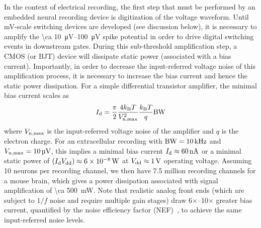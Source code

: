 In the context of electrical recording, the first step that must be performed by an embedded neural recording device is digitization of the voltage waveform.
Until \si{\milli\volt}-scale switching devices are developed (see discussion below), it is necessary to amplify the \SIrange{\ca 10}{100}{\micro\volt} spike potential in order to drive digital switching events in downstream gates.
During this sub-threshold amplification step, a CMOS (or BJT) device will dissipate static power (associated with a bias current). 
Importantly, in order to decrease the input-referred voltage noise of this amplification process, it is necessary to increase the bias current and hence the static power dissipation.
For a simple differential transistor amplifier, the minimal bias current scales as
\[I_{\text{\scriptsize d}} = \frac{\pi}{2} \frac{4k_{\text{\scriptsize B}} T}{V_{\text{\scriptsize n,max}}^2} \frac{k_{\text{\scriptsize B}} T}{q} \text{BW}\]
where $V_{\text{\scriptsize n,max}}$ is the input-referred voltage noise of the amplifier and $q$ is the electron charge.
For an extracellular recording with $\text{BW} = \SI{10}{\kilo\hertz}$ and $V_{\text{\scriptsize n,max}} = \SI{10}{\micro\volt}$, this implies a minimal bias current $I_{\text{\scriptsize d}}\approx\SI{60}{\nano\ampere}$ or a minimal static power of $\left(I_{\text{\scriptsize d}} V_{\text{\scriptsize dd}}\right)\approx\SI{6e-8}{\watt}$ at $V_{\text{\scriptsize dd}}\approx\SI{1}{\volt}$ operating voltage.
Assuming 10 neurons per recording channel, we then have 7.5 million recording channels for a mouse brain, which gives a power dissipation associated with signal amplification of \SI{\ca 500}{\milli\watt}.
Note that realistic analog front ends (which are subject to $1/f$ noise and require multiple gain stages) draw 6$\times$--10$\times$ greater bias current, quantified by the noise efficiency factor (NEF)~\cite{steyaert87}, to achieve the same input-referred noise levels.

